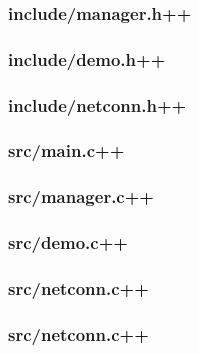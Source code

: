 \subsubsection{include/manager.h++}


\subsubsection{include/demo.h++}



\subsubsection{include/netconn.h++}



\subsubsection{src/main.c++}
 


\subsubsection{src/manager.c++}


\subsubsection{src/demo.c++}



\subsubsection{src/netconn.c++}



\subsubsection{src/netconn.c++}


